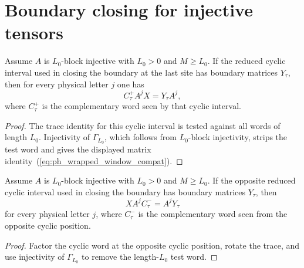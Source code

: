 \section{Boundary closing for injective tensors}\label{sec:injective_boundary_closing}

\begin{lemma}%
    \label{lem:wrapped_window_one_sided_compatibility}
    \leanok
    Assume $A$ is $L_0$-block injective with $L_0>0$ and $M \ge L_0$.
    If the reduced cyclic interval used in closing the boundary at the last site
    has boundary matrices $Y_\tau$, then for every physical letter $j$ one has
    \begin{equation}\label{eq:ph_wrapped_window_compat}
        C^+_\tau A^j X = Y_\tau A^j,
    \end{equation}
    where $C^+_\tau$ is the complementary word seen by that cyclic interval.
\end{lemma}

\begin{proof}
    \leanok
    The trace identity for this cyclic interval is tested against all words of
    length $L_0$. Injectivity of $\Gamma_{L_0}$, which follows from
    $L_0$-block injectivity, strips the test word and gives the displayed matrix
    identity~(\ref{eq:ph_wrapped_window_compat}).
\end{proof}

\begin{lemma}%
    \label{lem:mirror_wrapped_window_one_sided_compatibility}
    \leanok
    Assume $A$ is $L_0$-block injective with $L_0>0$ and $M \ge L_0$.
    If the opposite reduced cyclic interval used in closing the boundary has
    boundary matrices $Y_\tau$, then
    \[
        X A^j C^-_\tau = A^j Y_\tau
    \]
    for every physical letter $j$, where $C^-_\tau$ is the complementary word
    seen from the opposite cyclic position.
\end{lemma}

\begin{proof}
    \leanok
    Factor the cyclic word at the opposite cyclic position, rotate
    the trace, and use injectivity of $\Gamma_{L_0}$ to remove the
    length-$L_0$ test word.
\end{proof}


